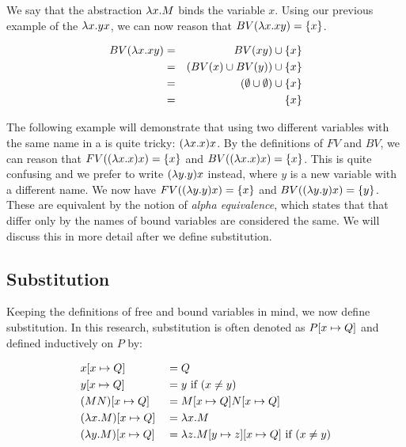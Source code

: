 We say that the abstraction $\lambda {x}.{M}$ binds the variable $x$. Using our previous example of the \lterm $\lambda {x}.{yx}$, we can now reason that $BV(\lambda {x}.{xy}) = \{x\}$. 

\begin{eqnarray*}
	BV(\lambda {x}.{xy}) &=& BV(xy) \cup \{x\} \\
	&=& (BV(x) \cup BV(y)) \cup \{x\} \\
	&=& (\emptyset \cup \emptyset) \cup \{x\} \\
	&=& \{x\}
\end{eqnarray*}


The following example will demonstrate that using two different variables with the same name in a \lterm is quite tricky: $(\lambda {x}.{x})x$.
By the definitions of $FV$ and $BV$, we can reason that $FV((\lambda {x}.{x})x) = \{x\}$ and $BV((\lambda {x}.{x})x) = \{x\}$.
This is quite confusing and we prefer to write $(\lambda {y}.{y})x$ instead, where $y$ is a new variable with a different name.
We now have $FV((\lambda {y}.{y})x) = \{x\}$ and $BV((\lambda {y}.{y})x) = \{y\}$.
These \lterms are equivalent by the notion of \emph{alpha equivalence}, which states that \lterms that differ only by the names of bound variables are considered the same.
We will discuss this in more detail after we define substitution.

\subsection{Substitution}
Keeping the definitions of free and bound variables in mind, we now define substitution. 
In this research, substitution is often denoted as $P [{x}\mapsto{Q}]$ and defined inductively on $P$ by:

\[
\begin{aligned}
	& x [{x}\mapsto{Q}]             & &= Q \\
	& y [{x}\mapsto{Q}]             & &= y \text{ if } (x \neq y)\\
	& (M N) [{x}\mapsto{Q}]         & &= M [{x}\mapsto{Q}] N [{x}\mapsto{Q}] \\
	& (\lambda {x}.{M}) [{x}\mapsto{Q}] & &= \lambda {x}.{M} \\
	& (\lambda {y}.{M}) [{x}\mapsto{Q}] & &= \lambda {z}.{M [{y}\mapsto{z}][{x}\mapsto{Q}]} \text{ if } (x \neq y) \\
\end{aligned}
\]

